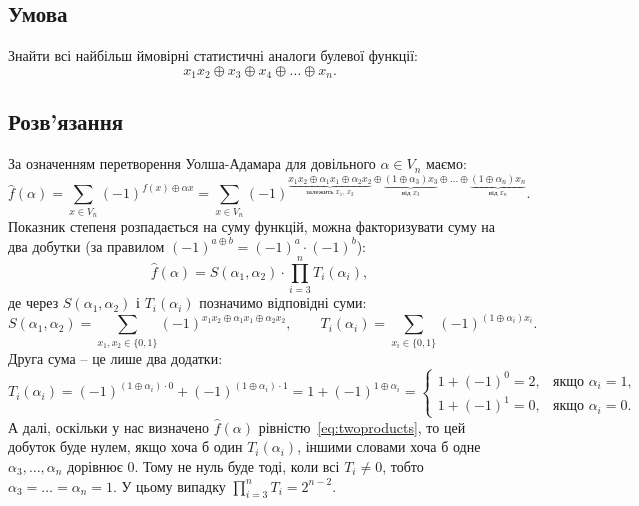 \chapter{}
\label{chap:2}

\section{Умова}
Знайти всі найбільш ймовірні статистичні аналоги булевої функції:
\begin{equation*}
    x_{1}x_{2} \oplus x_{3} \oplus x_{4} \oplus  \ldots \oplus x_{n}.
\end{equation*}

\section{Розв'язання}
За означенням перетворення Уолша-Адамара для довільного $\alpha \in V_n$ маємо:
\begin{equation*}
    \hat{f}(\alpha) = \sum_{x \in V_n} (-1)^{f(x) \oplus \alpha x}
    = \sum_{x \in V_n} (-1)^{\underbrace{x_1 x_2 \oplus \alpha_1 x_1 \oplus \alpha_2 x_2}_{\text{залежить } x_{1}, \, x_{2}}
        \oplus \underbrace{(1 \oplus \alpha_3) x_3}_{\text{від } x_{3}} \oplus \ldots 
        \oplus \underbrace{(1 \oplus \alpha_n) x_n}_{\text{від } x_{n}}}.
\end{equation*}
Показник степеня розпадається на суму функцій, можна факторизувати суму на два добутки (за правилом 
$(-1)^{a \oplus b} = (-1)^{a} \cdot (-1)^{b}$):
\begin{equation}
    \label{eq:twoproducts}
    \hat{f}(\alpha) = S(\alpha_1, \alpha_2) \cdot \prod_{i=3}^{n} T_i(\alpha_i),
\end{equation}
де через $S(\alpha_1, \alpha_2)$ і $T_i(\alpha_i)$ позначимо відповідні суми:
\begin{equation*}
    S(\alpha_1, \alpha_2) = \sum_{x_1, x_2 \in \{0,1\}} (-1)^{x_1 x_2 \oplus \alpha_1 x_1 \oplus \alpha_2 x_2},
    \qquad
    T_i(\alpha_i) = \sum_{x_i \in \{0,1\}} (-1)^{(1 \oplus \alpha_i) x_i}.
\end{equation*}
Друга сума -- це лише два додатки:
\begin{equation*}
    T_i(\alpha_i) = (-1)^{(1 \oplus \alpha_{i}) \cdot 0} + (-1)^{(1 \oplus \alpha_{i}) \cdot 1} =
    1 + (-1)^{1 \oplus \alpha_{i}} =
    \begin{cases}
        1 + (-1)^0 = 2, & \text{якщо } \alpha_i = 1, \\
        1 + (-1)^1 = 0, & \text{якщо } \alpha_i = 0.
    \end{cases}
\end{equation*}
А далі, оскільки у нас визначено $\hat{f}(\alpha)$ рівністю~\eqref{eq:twoproducts}, то цей добуток буде 
нулем, якщо хоча б один $T_{i}(\alpha_{i})$, іншими словами хоча б одне $\alpha_3, \ldots, \alpha_n$ дорівнює 
$0$. Тому не нуль буде тоді, коли всі $T_{i} \neq 0$, тобто $\alpha_3 = \ldots = \alpha_n = 1$. 
У цьому випадку $\prod\limits_{i=3}^{n} T_i = 2^{n-2}$. 

